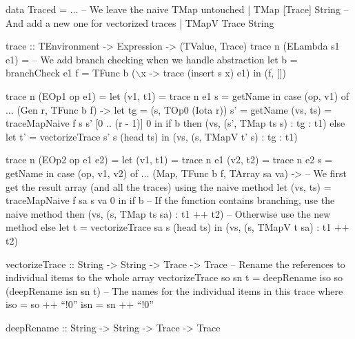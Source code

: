         \begin{haskell}[caption=Array mapping with trace vectorization, label=lst:vectorize, gobble=12]
            data Traced
                = $\ldots$
                -- We leave the naive TMap untouched
                | TMap  [Trace] String
                -- And add a new one for vectorized traces
                | TMapV Trace   String

            trace :: TEnvironment -> Expression -> (TValue, Trace)
            trace n (ELambda s1 e1) =
                -- We add branch checking when we handle abstraction
                let b = branchCheck e1
                    f = TFunc b ($\backslash$x -> trace (insert s x) e1)
                in  (f, [])

            trace n (EOp1 op e1) =
                let (v1, t1) = trace n e1
                    s = getName
                in  case (op, v1) of
                    $\ldots$
                    (Gen r, TFunc b f) ->
                        let tg = (s, TOp0 (Iota r))
                            s' = getName
                            (vs, ts) = traceMapNaive f s s' [0 .. (r - 1)] 0
                        in  if   b
                            then (vs, (s', TMap ts s) : tg : t1)
                            else let t' = vectorizeTrace s' s (head ts)
                                 in  (vs, (s, TMapV t' s) : tg : t1)

            trace n (EOp2 op e1 e2) =
                let (v1, t1) = trace n e1
                    (v2, t2) = trace n e2
                    s = getName
                in  case (op, v1, v2) of
                    $\ldots$
                    (Map, TFunc b f, TArray sa va) ->
                        -- We first get the result array (and all the traces) using the naive method
                        let (vs, ts) = traceMapNaive f sa s va 0
                        in  if   b
                            -- If the function contains branching, use the naive method
                            then (vs, (s, TMap ts sa) : t1 ++ t2)
                            -- Otherwise use the new method
                            else let t = vectorizeTrace sa s (head ts)
                                 in  (vs, (s, TMapV t sa) : t1 ++ t2)

            vectorizeTrace :: String -> String -> Trace -> Trace
            -- Rename the references to individual items to the whole array
            vectorizeTrace so sn t = deepRename iso so (deepRename isn sn t)
                -- The names for the individual items in this trace
                where iso = so ++ ``!0''
                      isn = sn ++ ``!0''

            deepRename :: String -> String -> Trace -> Trace
        \end{haskell}

